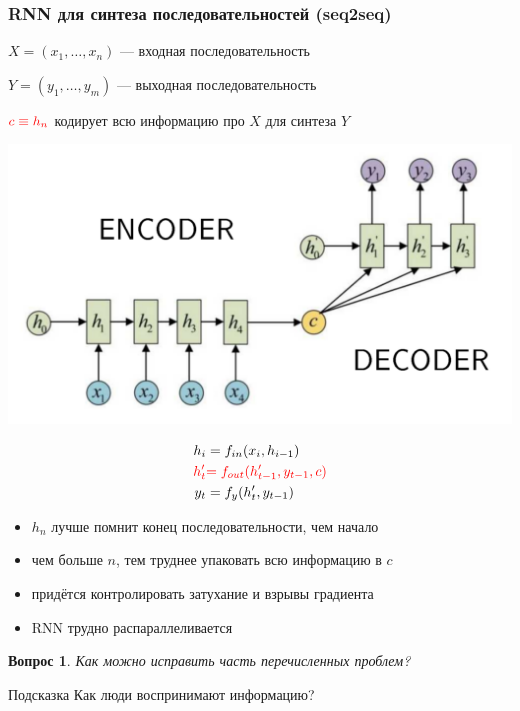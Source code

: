 \documentclass[fullscreen=true, bookmarks=true, hyperref={pdfencoding=unicode}]{beamer}
\newtheorem*{question}{Вопрос}
\begin{document}
\begin{frame}
  \frametitle{RNN для синтеза последовательностей (seq2seq)}

  $X = (x_1, \dots, x_n)$ — входная последовательность

  $Y = (y_1, \dots, y_m)$ — выходная последовательность

  ${\color{red}c \equiv h_n}$ кодирует всю информацию про $X$ для синтеза $Y$

  \begin{center}
    \includegraphics[keepaspectratio,
                   width=.7\paperwidth]{seq2seq.png}
  \end{center}
\end{frame}


\begin{frame}
  \begin{center}
    \begin{align*}
      h_i &= f_{in}(x_i, h_{i-1}) \\
      {\color{red}h_t^\prime} &{\color{red}= f_{out}(h_{t-1}^\prime,y_{t-1},c)} \\
      y_t &= f_{y}(h_t^\prime, y_{t-1})
    \end{align*}
  \end{center}

  \begin{itemize}
    \item $h_n$ лучше помнит конец последовательности, чем начало
    \item чем больше $n$, тем труднее упаковать всю информацию в $c$
    \item придётся контролировать затухание и взрывы градиента
    \item RNN трудно распараллеливается
  \end{itemize}
  \pause
  \begin{question}
    Как можно исправить часть перечисленных проблем?
  \end{question}
  \pause
  \begin{exampleblock}{Подсказка}
    Как люди воспринимают информацию?
  \end{exampleblock}
\end{frame}
\end{document}

